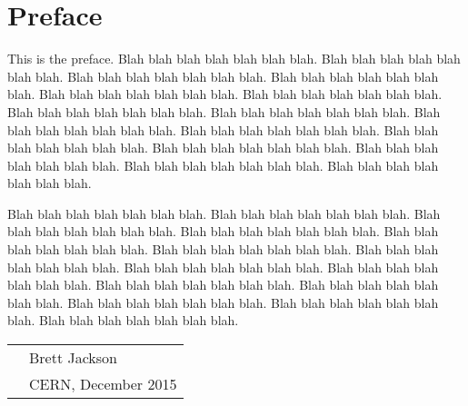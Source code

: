 
\chapter*{Preface}

This is the preface.  Blah blah blah blah blah blah blah.
Blah blah blah blah blah blah blah.  Blah blah blah blah blah blah blah.
Blah blah blah blah blah blah blah.  Blah blah blah blah blah blah blah.
Blah blah blah blah blah blah blah.  Blah blah blah blah blah blah blah.
Blah blah blah blah blah blah blah.  Blah blah blah blah blah blah blah.
Blah blah blah blah blah blah blah.  Blah blah blah blah blah blah blah.
Blah blah blah blah blah blah blah.  Blah blah blah blah blah blah blah.
Blah blah blah blah blah blah blah.  Blah blah blah blah blah blah blah.

Blah blah blah blah blah blah blah.  Blah blah blah blah blah blah blah.
Blah blah blah blah blah blah blah.  Blah blah blah blah blah blah blah.
Blah blah blah blah blah blah blah.  Blah blah blah blah blah blah blah.
Blah blah blah blah blah blah blah.  Blah blah blah blah blah blah blah.
Blah blah blah blah blah blah blah.  Blah blah blah blah blah blah blah.
Blah blah blah blah blah blah blah.  Blah blah blah blah blah blah blah.
Blah blah blah blah blah blah blah.  Blah blah blah blah blah blah blah.

\vspace{0.05\textheight}

\begin{tabular}{p{} l}
  & Brett Jackson         \\
  & CERN, December 2015   \\
\end{tabular}

